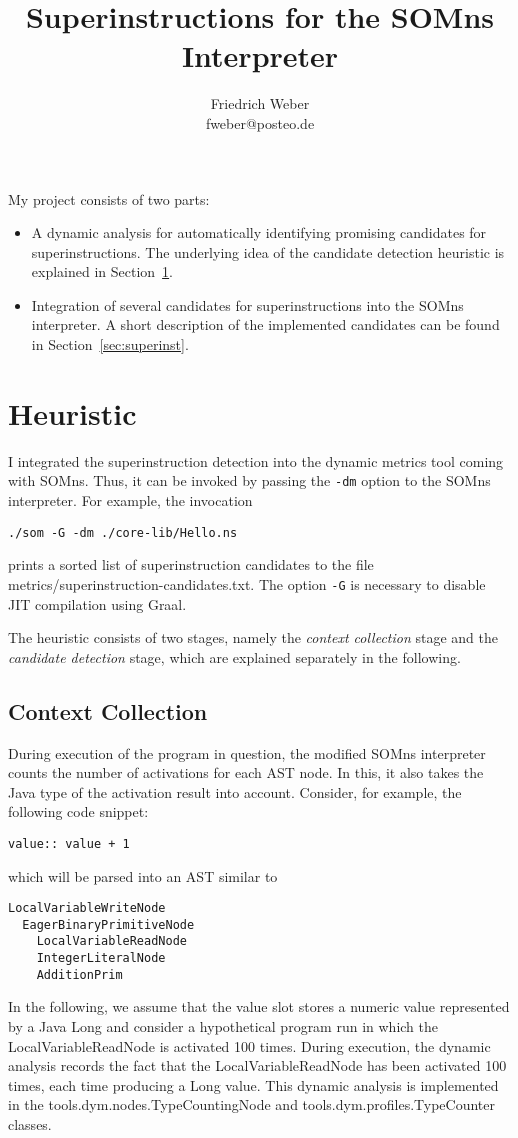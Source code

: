 \documentclass[10pt,a4paper]{article}
\author{Friedrich Weber\\
\small fweber@posteo.de}
\title{Superinstructions for the SOMns Interpreter}
\begin{document}
	
\maketitle

My project consists of two parts:
\begin{itemize}
	\item A dynamic analysis for automatically identifying promising candidates for superinstructions. The underlying idea of the candidate detection heuristic is explained in Section~\ref{sec:heuristic}.
	\item Integration of several candidates for superinstructions into the SOMns interpreter. A short description of the implemented candidates can be found in Section~\ref{sec:superinst}.
\end{itemize}

\section{Heuristic}\label{sec:heuristic}

I integrated the superinstruction detection into the dynamic metrics tool coming with SOMns. Thus, it can be invoked by passing the \verb|-dm| option to the SOMns interpreter. For example, the invocation
\begin{verbatim}
./som -G -dm ./core-lib/Hello.ns
\end{verbatim}
prints a sorted list of superinstruction candidates to the file \textsf{metrics/superinstruction-candidates.txt}. The option \verb|-G| is necessary to disable JIT compilation using Graal.

The heuristic consists of two stages, namely the \emph{context collection} stage and the \emph{candidate detection} stage, which are explained separately in the following.

\subsection{Context Collection}

During execution of the program in question, the modified SOMns interpreter counts the number of activations for each AST node. In this, it also takes the Java type of the activation result into account. Consider, for example, the following code snippet:
\begin{verbatim}
value:: value + 1
\end{verbatim}
which will be parsed into an AST similar to
\begin{verbatim}
LocalVariableWriteNode
  EagerBinaryPrimitiveNode
    LocalVariableReadNode
    IntegerLiteralNode
    AdditionPrim
\end{verbatim}
In the following, we assume that the \textsf{value} slot stores a numeric value represented by a Java \textsf{Long} and consider a hypothetical program run in which the \textsf{LocalVariableReadNode} is activated 100 times. During execution, the dynamic analysis records the fact that the \textsf{LocalVariableReadNode} has been activated 100 times, each time producing a \textsf{Long} value. This dynamic analysis is implemented in the \textsf{tools.dym.nodes.TypeCountingNode} and \textsf{tools.dym.profiles.TypeCounter} classes.
\end{document}
